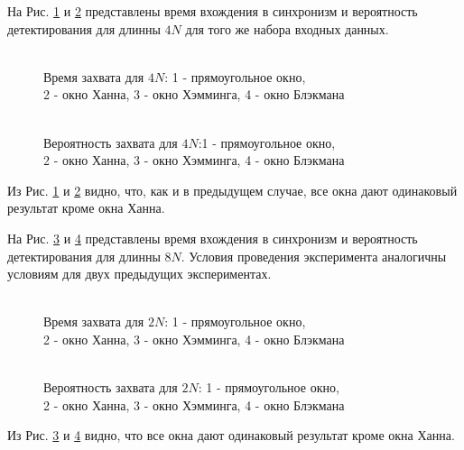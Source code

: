 На Рис. \ref{pic:dma5mhz_4fft_lockTime} и \ref{pic:dma5mhz_4fft_probDetection} представлены время вхождения в синхронизм и вероятность детектирования для длинны ${4N}$
для того же набора входных данных.
\begin{figure}[h]
\center{}
	\caption{\\Время захвата для ${4N}$: 1 - прямоугольное окно,\\2 - окно Ханна, 3 - окно Хэмминга, 4 - окно Блэкмана}
	\label{pic:dma5mhz_4fft_lockTime}
\end{figure}
\begin{figure}[h]
\center{}
	\caption{\\Вероятность захвата для ${4N}$:1 - прямоугольное окно,\\2 - окно Ханна, 3 - окно Хэмминга, 4 - окно Блэкмана}
	\label{pic:dma5mhz_4fft_probDetection}
\end{figure}
Из Рис. \ref{pic:dma5mhz_4fft_lockTime} и \ref{pic:dma5mhz_4fft_probDetection} видно, что, как и в предыдущем случае, все окна дают одинаковый результат кроме окна Ханна.

На Рис. \ref{pic:dma5mhz_8fft_lockTime} и \ref{pic:dma5mhz_8fft_probDetection} представлены время вхождения в синхронизм и вероятность детектирования для длинны ${8N}$. Условия
проведения эксперимента аналогичны условиям для двух предыдущих экспериментах.
\begin{figure}[h]
\center{}
	\caption{\\Время захвата для ${2N}$: 1 - прямоугольное окно,\\2 - окно Ханна, 3 - окно Хэмминга, 4 - окно Блэкмана}
	\label{pic:dma5mhz_8fft_lockTime}
\end{figure}
\begin{figure}[h]
\center{}
	\caption{\\Вероятность захвата для ${2N}$: 1 - прямоугольное окно,\\2 - окно Ханна, 3 - окно Хэмминга, 4 - окно Блэкмана}
	\label{pic:dma5mhz_8fft_probDetection}
\end{figure}
Из Рис. \ref{pic:dma5mhz_8fft_lockTime} и \ref{pic:dma5mhz_8fft_probDetection} видно, что все окна дают одинаковый результат кроме окна Ханна.

